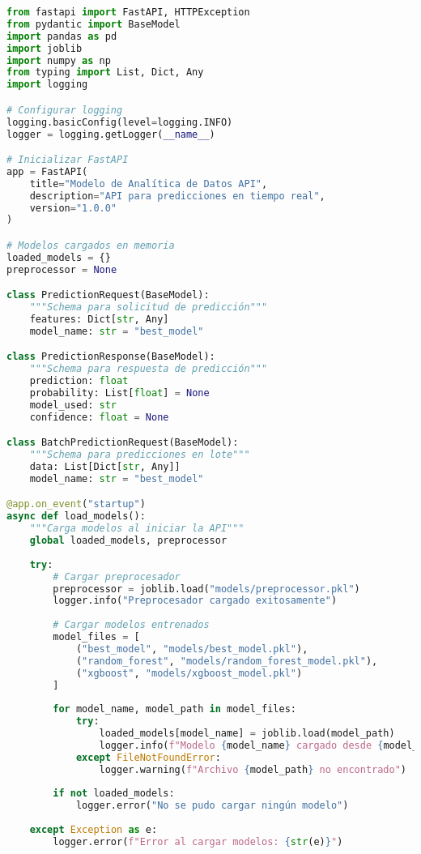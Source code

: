 \begin{lstlisting}[language=Python, caption=API REST para predicciones en tiempo real]
from fastapi import FastAPI, HTTPException
from pydantic import BaseModel
import pandas as pd
import joblib
import numpy as np
from typing import List, Dict, Any
import logging

# Configurar logging
logging.basicConfig(level=logging.INFO)
logger = logging.getLogger(__name__)

# Inicializar FastAPI
app = FastAPI(
    title="Modelo de Analítica de Datos API",
    description="API para predicciones en tiempo real",
    version="1.0.0"
)

# Modelos cargados en memoria
loaded_models = {}
preprocessor = None

class PredictionRequest(BaseModel):
    """Schema para solicitud de predicción"""
    features: Dict[str, Any]
    model_name: str = "best_model"

class PredictionResponse(BaseModel):
    """Schema para respuesta de predicción"""
    prediction: float
    probability: List[float] = None
    model_used: str
    confidence: float = None

class BatchPredictionRequest(BaseModel):
    """Schema para predicciones en lote"""
    data: List[Dict[str, Any]]
    model_name: str = "best_model"

@app.on_event("startup")
async def load_models():
    """Carga modelos al iniciar la API"""
    global loaded_models, preprocessor
    
    try:
        # Cargar preprocesador
        preprocessor = joblib.load("models/preprocessor.pkl")
        logger.info("Preprocesador cargado exitosamente")
        
        # Cargar modelos entrenados
        model_files = [
            ("best_model", "models/best_model.pkl"),
            ("random_forest", "models/random_forest_model.pkl"),
            ("xgboost", "models/xgboost_model.pkl")
        ]
        
        for model_name, model_path in model_files:
            try:
                loaded_models[model_name] = joblib.load(model_path)
                logger.info(f"Modelo {model_name} cargado desde {model_path}")
            except FileNotFoundError:
                logger.warning(f"Archivo {model_path} no encontrado")
        
        if not loaded_models:
            logger.error("No se pudo cargar ningún modelo")
        
    except Exception as e:
        logger.error(f"Error al cargar modelos: {str(e)}")


\end{lstlisting}
